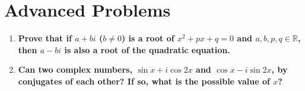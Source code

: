 \documentclass[12pt]{article}
\begin{document}
\section*{Advanced Problems}
\begin{enumerate}
    \item \textbf{Prove that if $a + bi$ ($b \neq 0$) is a root of $x^2 + px + q = 0$ and $a, b, p, q \in \mathbb{R}$, then $a - bi$ is also a root of the quadratic equation.}
    \item \textbf{Can two complex numbers, $\sin{x} + i\cos{2x}$ and $\cos{x} - i\sin{2x}$, by conjugates of each other? If so, what is the possible value of $x$?}
\end{enumerate}
\end{document}
